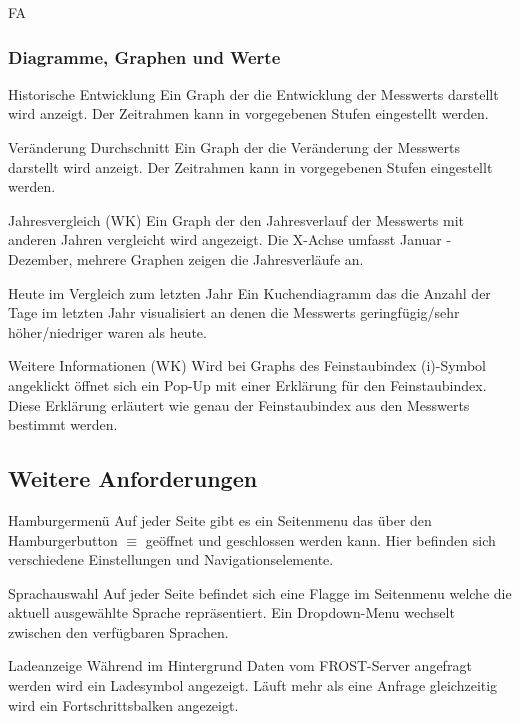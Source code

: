 \begin{Kriterien}{FA}
 \subsubsection{Diagramme, Graphen und Werte}

 \item[Historische Entwicklung]
   Ein Graph der die Entwicklung der \glspl{Messwert} darstellt wird anzeigt.
   Der Zeitrahmen kann in vorgegebenen Stufen eingestellt werden.
 
 \item[Veränderung Durchschnitt]
   Ein Graph der die Veränderung der \glspl{Messwert} darstellt wird anzeigt.
   Der Zeitrahmen kann in vorgegebenen Stufen eingestellt werden.

 \item[Jahresvergleich (WK)]
   Ein Graph der den Jahresverlauf der \glspl{Messwert} mit anderen Jahren vergleicht wird angezeigt.
   Die X-Achse umfasst Januar - Dezember, mehrere Graphen zeigen die Jahresverläufe an.

 \item[Heute im Vergleich zum letzten Jahr]
   Ein \gls{Kuchendiagramm} das die Anzahl der Tage im letzten Jahr visualisiert an denen die \glspl{Messwert} geringfügig/sehr höher/niedriger waren als heute.

 \item[Weitere Informationen (WK)]
   Wird bei \glspl{Graph} des \gls{Feinstaubindex} (i)-Symbol angeklickt öffnet sich ein \gls{Pop-Up} mit einer Erklärung für den \gls{Feinstaubindex}.
   Diese Erklärung erläutert wie genau der \gls{Feinstaubindex} aus den \glspl{Messwert} bestimmt werden.

\subsection{Weitere Anforderungen}

 \item[Hamburgermenü]
  Auf jeder Seite gibt es ein \gls{Seitenmenu} das über den Hamburgerbutton $\equiv$ geöffnet und geschlossen werden kann.
  Hier befinden sich verschiedene Einstellungen und Navigationselemente.

 \item[Sprachauswahl]
   Auf jeder Seite befindet sich eine Flagge im \gls{Seitenmenu} welche die aktuell ausgewählte Sprache repräsentiert.
   Ein \gls{Dropdown-Menu} wechselt zwischen den verfügbaren Sprachen.

 \item[Ladeanzeige]
  Während im Hintergrund Daten vom \gls{FROST-Server} angefragt werden wird ein Ladesymbol angezeigt.
  Läuft mehr als eine Anfrage gleichzeitig wird ein Fortschrittsbalken angezeigt.


\end{Kriterien}
